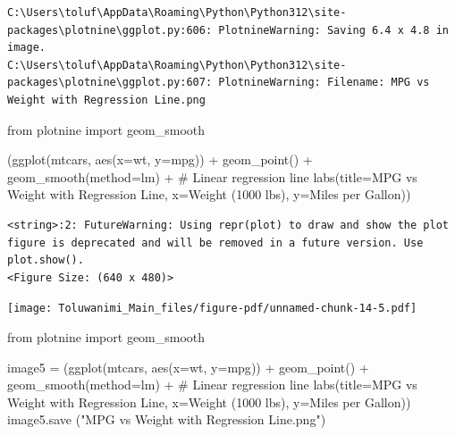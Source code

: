 \documentclass[
  letterpaper,
  DIV=11,
  numbers=noendperiod]{scrreprt}
\newenvironment{Shaded}{\begin{snugshade}}{\end{snugshade}}
\newcommand{\CommentTok}[1]{\textcolor[rgb]{0.37,0.37,0.37}{#1}}
\newcommand{\ImportTok}[1]{\textcolor[rgb]{0.00,0.46,0.62}{#1}}
\newcommand{\NormalTok}[1]{\textcolor[rgb]{0.00,0.23,0.31}{#1}}
\newcommand{\OperatorTok}[1]{\textcolor[rgb]{0.37,0.37,0.37}{#1}}
\newcommand{\StringTok}[1]{\textcolor[rgb]{0.13,0.47,0.30}{#1}}
\begin{document}
\begin{verbatim}
C:\Users\toluf\AppData\Roaming\Python\Python312\site-packages\plotnine\ggplot.py:606: PlotnineWarning: Saving 6.4 x 4.8 in image.
C:\Users\toluf\AppData\Roaming\Python\Python312\site-packages\plotnine\ggplot.py:607: PlotnineWarning: Filename: MPG vs Weight with Regression Line.png
\end{verbatim}

\begin{Shaded}
\begin{Highlighting}[]
\ImportTok{from}\NormalTok{ plotnine }\ImportTok{import}\NormalTok{ geom\_smooth}

\NormalTok{(ggplot(mtcars, aes(x}\OperatorTok{=}\StringTok{\textquotesingle{}wt\textquotesingle{}}\NormalTok{, y}\OperatorTok{=}\StringTok{\textquotesingle{}mpg\textquotesingle{}}\NormalTok{)) }\OperatorTok{+}
\NormalTok{ geom\_point() }\OperatorTok{+}
\NormalTok{ geom\_smooth(method}\OperatorTok{=}\StringTok{\textquotesingle{}lm\textquotesingle{}}\NormalTok{) }\OperatorTok{+}  \CommentTok{\# Linear regression line}
\NormalTok{ labs(title}\OperatorTok{=}\StringTok{\textquotesingle{}MPG vs Weight with Regression Line\textquotesingle{}}\NormalTok{,}
\NormalTok{      x}\OperatorTok{=}\StringTok{\textquotesingle{}Weight (1000 lbs)\textquotesingle{}}\NormalTok{,}
\NormalTok{      y}\OperatorTok{=}\StringTok{\textquotesingle{}Miles per Gallon\textquotesingle{}}\NormalTok{))}
\end{Highlighting}
\end{Shaded}

\begin{verbatim}
<string>:2: FutureWarning: Using repr(plot) to draw and show the plot figure is deprecated and will be removed in a future version. Use plot.show().
<Figure Size: (640 x 480)>
\end{verbatim}

\texttt{[image: Toluwanimi\_Main\_files/figure-pdf/unnamed-chunk-14-5.pdf]}

\begin{Shaded}
\begin{Highlighting}[]
\ImportTok{from}\NormalTok{ plotnine }\ImportTok{import}\NormalTok{ geom\_smooth}

\NormalTok{image5 }\OperatorTok{=}\NormalTok{ (ggplot(mtcars, aes(x}\OperatorTok{=}\StringTok{\textquotesingle{}wt\textquotesingle{}}\NormalTok{, y}\OperatorTok{=}\StringTok{\textquotesingle{}mpg\textquotesingle{}}\NormalTok{)) }\OperatorTok{+}
\NormalTok{ geom\_point() }\OperatorTok{+}
\NormalTok{ geom\_smooth(method}\OperatorTok{=}\StringTok{\textquotesingle{}lm\textquotesingle{}}\NormalTok{) }\OperatorTok{+}  \CommentTok{\# Linear regression line}
\NormalTok{ labs(title}\OperatorTok{=}\StringTok{\textquotesingle{}MPG vs Weight with Regression Line\textquotesingle{}}\NormalTok{,}
\NormalTok{      x}\OperatorTok{=}\StringTok{\textquotesingle{}Weight (1000 lbs)\textquotesingle{}}\NormalTok{,}
\NormalTok{      y}\OperatorTok{=}\StringTok{\textquotesingle{}Miles per Gallon\textquotesingle{}}\NormalTok{))}
\NormalTok{image5.save (}\StringTok{"MPG vs Weight with Regression Line.png"}\NormalTok{)}
\end{Highlighting}
\end{Shaded}
\end{document}
